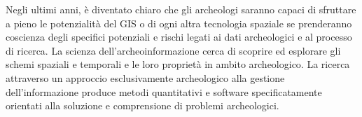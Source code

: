	Negli ultimi anni, è diventato chiaro che gli archeologi saranno capaci di sfruttare a pieno le potenzialità del GIS o di ogni altra tecnologia spaziale se prenderanno coscienza degli specifici potenziali e rischi legati ai dati archeologici e al processo di ricerca. La scienza dell'archeoinformazione cerca di scoprire ed esplorare gli schemi spaziali e temporali e le loro proprietà in ambito archeologico. La ricerca attraverso un approccio esclusivamente archeologico alla gestione dell'informazione produce metodi quantitativi e software specificatamente orientati alla soluzione e comprensione di problemi archeologici.
